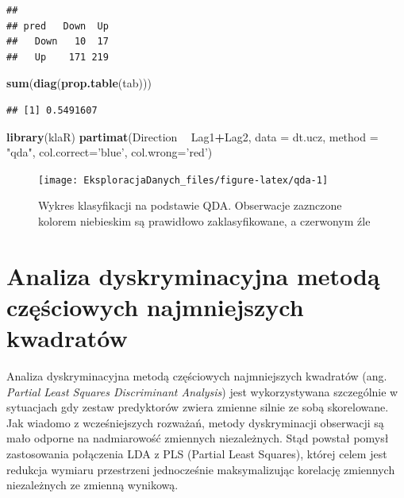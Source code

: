 \documentclass[]{book}
\newenvironment{Shaded}{\begin{snugshade}}{\end{snugshade}}
\newcommand{\DataTypeTok}[1]{\textcolor[rgb]{0.13,0.29,0.53}{#1}}
\newcommand{\KeywordTok}[1]{\textcolor[rgb]{0.13,0.29,0.53}{\textbf{#1}}}
\newcommand{\NormalTok}[1]{#1}
\newcommand{\OperatorTok}[1]{\textcolor[rgb]{0.81,0.36,0.00}{\textbf{#1}}}
\newcommand{\StringTok}[1]{\textcolor[rgb]{0.31,0.60,0.02}{#1}}
\theoremstyle{plain}
\theoremstyle{definition}
\theoremstyle{definition}
\theoremstyle{definition}
\theoremstyle{definition}
\theoremstyle{remark}
\begin{document}
\begin{verbatim}
##       
## pred   Down  Up
##   Down   10  17
##   Up    171 219
\end{verbatim}

\begin{Shaded}
\begin{Highlighting}[]
\KeywordTok{sum}\NormalTok{(}\KeywordTok{diag}\NormalTok{(}\KeywordTok{prop.table}\NormalTok{(tab)))}
\end{Highlighting}
\end{Shaded}

\begin{verbatim}
## [1] 0.5491607
\end{verbatim}

\begin{Shaded}
\begin{Highlighting}[]
\KeywordTok{library}\NormalTok{(klaR)}
\KeywordTok{partimat}\NormalTok{(Direction }\OperatorTok{~}\StringTok{ }\NormalTok{Lag1}\OperatorTok{+}\NormalTok{Lag2, }
         \DataTypeTok{data =}\NormalTok{ dt.ucz,}
         \DataTypeTok{method =} \StringTok{"qda"}\NormalTok{,}
         \DataTypeTok{col.correct=}\StringTok{'blue'}\NormalTok{,}
         \DataTypeTok{col.wrong=}\StringTok{'red'}\NormalTok{)}
\end{Highlighting}
\end{Shaded}

\begin{figure}

{\centering \texttt{[image: EksploracjaDanych\_files/figure-latex/qda-1]} 

}

\caption{Wykres klasyfikacji na podstawie QDA. Obserwacje zaznczone kolorem niebieskim są prawidłowo zaklasyfikowane, a czerwonym źle}\label{fig:qda}
\end{figure}

\hypertarget{analiza-dyskryminacyjna-metoda-czesciowych-najmniejszych-kwadratow}{%
\section{Analiza dyskryminacyjna metodą częściowych najmniejszych kwadratów}\label{analiza-dyskryminacyjna-metoda-czesciowych-najmniejszych-kwadratow}}

Analiza dyskryminacyjna metodą częściowych najmniejszych kwadratów (ang. \emph{Partial Least Squares Discriminant Analysis}) jest wykorzystywana szczególnie w sytuacjach gdy zestaw predyktorów zwiera zmienne silnie ze sobą skorelowane. Jak wiadomo z wcześniejszych rozważań, metody dyskryminacji obserwacji są mało odporne na nadmiarowość zmiennych niezależnych. Stąd powstał pomysł zastosowania połączenia LDA z PLS (Partial Least Squares), której celem jest redukcja wymiaru przestrzeni jednocześnie maksymalizując korelację zmiennych niezależnych ze zmienną wynikową.
\end{document}
